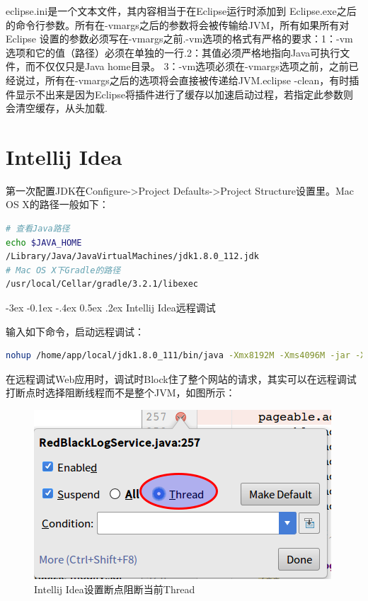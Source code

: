 \documentclass[12pt]{book}
\makeatletter
\numberwithin{dummy}{section}
\theoremstyle{ocrenumbox}
\theoremstyle{blacknumex}
\theoremstyle{blacknumbox}
\theoremstyle{ocrenum}
\renewcommand{\subsection}{\@startsection {subsection}{2}{\z@}
	{-3ex \@plus -0.1ex \@minus -.4ex}
	{0.5ex \@plus.2ex }
	{\normalfont\sffamily\bfseries}}
\makeatother
\begin{document}
eclipse.ini是一个文本文件，其内容相当于在Eclipse运行时添加到 Eclipse.exe之后的命令行参数。所有在-vmargs之后的参数将会被传输给JVM，所有如果所有对Eclipse 设置的参数必须写在-vmargs之前.-vm选项的格式有严格的要求：1：-vm选项和它的值（路径）必须在单独的一行.2：其值必须严格地指向Java可执行文件，而不仅仅只是Java home目录。
3：-vm选项必须在-vmargs选项之前，之前已经说过，所有在-vmargs之后的选项将会直接被传递给JVM.eclipse -clean，有时插件显示不出来是因为Eclipse将插件进行了缓存以加速启动过程，若指定此参数则会清空缓存，从头加载.


\chapter{Intellij Idea}

第一次配置JDK在Configure->Project Defaults->Project Structure设置里。Mac OS X的路径一般如下：

\begin{lstlisting}[language=Bash]
# 查看Java路径
echo $JAVA_HOME
/Library/Java/JavaVirtualMachines/jdk1.8.0_112.jdk
# Mac OS X下Gradle的路径
/usr/local/Cellar/gradle/3.2.1/libexec
\end{lstlisting}

\subsection{Intellij Idea远程调试}

输入如下命令，启动远程调试：

\begin{lstlisting}[language=Bash]
nohup /home/app/local/jdk1.8.0_111/bin/java -Xmx8192M -Xms4096M -jar -Xdebug -Xrunjdwp:transport=dt_socket,suspend=n,server=y,address=5005 /home/app/backend/credit-system-web-boot-1.1.9.jar --spring.config.location=application.properties>/dev/null &
\end{lstlisting}

在远程调试Web应用时，调试时Block住了整个网站的请求，其实可以在远程调试打断点时选择阻断线程而不是整个JVM，如图所示：

\begin{figure}[htbp]
	\centering
	\includegraphics[scale=0.6]{intellijideabreakthread.png}
	\caption{Intellij Idea设置断点阻断当前Thread}
	\label{fig:intellijideabreakthread}
\end{figure}
\end{document}
